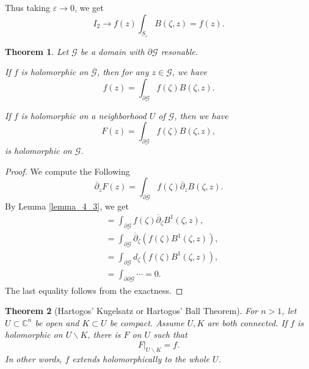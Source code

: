 \documentclass{article}
\newtheorem{theorem}{Theorem} [section]
\newcommand{\C}[0]{\mathbb{C}}
\newcommand{\bd}[0]{\partial}
\begin{document}
Thus taking $\varepsilon\to 0$, we get 
\begin{equation*}
  I_2\to f(z)\int_{S_\varepsilon}B(\zeta,z) = f(z).
\end{equation*}
\begin{theorem}
  Let $\mathcal{G}$ be a domain with $\bd\mathcal{G}$ resonable. \\
  \par If $f$ is holomorphic on $\overline{\mathcal{G}}$, then for any $z\in\mathcal{G}$, we have 
  \begin{equation*}
    f(z) = \int_{\bd\mathcal{G}}f(\zeta)B(\zeta,z).
  \end{equation*}
  \par If $f$ is holomorphic on a neighborhood $U$ of $\mathcal{G}$, then we have 
  \begin{equation*}
    F(z) = \int_{\partial\mathcal{G}}f(\zeta)B(\zeta,z),
  \end{equation*}
  is holomorphic on $\mathcal{G}$.
\end{theorem}
\begin{proof}
We compute the Following
\begin{equation*}
  \overline{\partial}_zF(z) = \int_{\partial\mathcal{G}}f(\zeta)\overline{\partial}_zB(\zeta,z).
\end{equation*}
By Lemma \ref{lemma_4_3}, we get 
\begin{align*}
  & = \int_{\partial\mathcal{G}}f(\zeta)\overline{\partial}_\zeta B^{1}(\zeta,z),\\
  & = \int_{\partial\mathcal{G}}\overline{\partial}_\zeta(f(\zeta)B^1(\zeta,z)),\\
  & = \int_{\partial\mathcal{G}}d_\zeta(f(\zeta)B^1(\zeta,z)),\\
  & = \int_{\partial\partial\mathcal{G}}\cdots = 0.
\end{align*}
The last equality follows from the exactness.
\end{proof}
\begin{theorem}[Hartogos' Kugelsatz or Hartogos' Ball Theorem]
  For $n>1$, let $U\subset\C^n$ be open and $K\subset U$ be compact. Assume $U,K$ are both connected. If $f$ is holomorphic on $U\backslash K$, there is $F$ on $U$ such that 
  \begin{equation*}
    F|_{U\backslash K} = f.
  \end{equation*}
  In other words, $f$ extends holomorphically to the whole $U$. 
\end{theorem}
\end{document}
